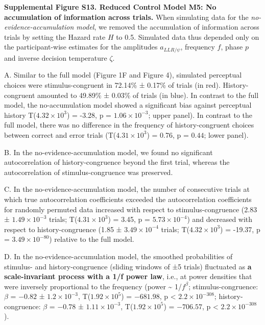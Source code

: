 \documentclass[
]{article}
\begin{document}
\textbf{Supplemental Figure S13. Reduced Control Model M5: No
accumulation of information across trials.} When simulating data for the
\emph{no-evidence-accumulation model}, we removed the accumulation of
information across trials by setting the Hazard rate \(H\) to 0.5.
Simulated data thus depended only on the participant-wise estimates for
the amplitudes \(a_{LLR/\psi}\), frequency \(f\), phase \(p\) and
inverse decision temperature \(\zeta\).

A. Similar to the full model (Figure 1F and Figure 4), simulated
perceptual choices were stimulus-congruent in 72.14\% ± 0.17\% of trials
(in red). History-congruent amounted to 49.89\% ± 0.03\% of trials (in
blue). In contrast to the full model, the no-accumulation model showed a
significant bias against perceptual history
T(\ensuremath{4.32\times 10^{3}}) = -3.28, p =
\(\ensuremath{1.06\times 10^{-3}}\); upper panel). In contrast to the
full model, there was no difference in the frequency of
history-congruent choices between correct and error trials
(T(\ensuremath{4.31\times 10^{3}}) = 0.76, p = \(0.44\); lower panel).

B. In the no-evidence-accumulation model, we found no significant
autocorrelation of history-congruence beyond the first trial, whereas
the autocorrelation of stimulus-congruence was preserved.

C. In the no-evidence-accumulation model, the number of consecutive
trials at which true autocorrelation coefficients exceeded the
autocorrelation coefficients for randomly permuted data increased with
respect to stimulus-congruence (2.83 ± \ensuremath{1.49\times 10^{-3}}
trials; T(\ensuremath{4.31\times 10^{3}}) = 3.45, p =
\(\ensuremath{5.73\times 10^{-4}}\)) and decreased with respect to
history-congruence (1.85 ± \ensuremath{3.49\times 10^{-4}} trials;
T(\ensuremath{4.32\times 10^{3}}) = -19.37, p =
\(\ensuremath{3.49\times 10^{-80}}\)) relative to the full model.

D. In the no-evidence-accumulation model, the smoothed probabilities of
stimulus- and history-congruence (sliding windows of ±5 trials)
fluctuated as \textbf{a scale-invariant process with a 1/f power law},
i.e., at power densities that were inversely proportional to the
frequency (power \textasciitilde{} 1/\(f^\beta\); stimulus-congruence:
\(\beta\) = \(-0.82\) ± \(\ensuremath{1.2\times 10^{-3}}\),
T(\(\ensuremath{1.92\times 10^{5}}\)) = \(-681.98\), p < \(\ensuremath{2.2\times 10^{-308}}\);
history-congruence: \(\beta\) = \(-0.78\) ±
\(\ensuremath{1.11\times 10^{-3}}\),
T(\(\ensuremath{1.92\times 10^{5}}\)) = \(-706.57\), p < \(\ensuremath{2.2\times 10^{-308}}\)).
\end{document}
